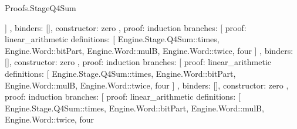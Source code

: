 \begin{lexlean}{Proofs.StageQ4Sum}
\begin{semanticmodule}
{{{{{{{{{{{{                                  ]
                                },
                                binders: [],
                                constructor: zero
                              },
                              {
                                proof: induction{
                                  branches: [
                                    {
                                      proof: linear_arithmetic{
                                        definitions: [
                                          Engine.Stage.Q4Sum::times,
                                          Engine.Word::bitPart,
                                          Engine.Word::mulB,
                                          Engine.Word::twice,
                                          four
                                        ]
                                      },
                                      binders: [],
                                      constructor: zero
                                    },
                                    {
                                      proof: induction{
                                        branches: [
                                          {
                                            proof: linear_arithmetic{
                                              definitions: [
                                                Engine.Stage.Q4Sum::times,
                                                Engine.Word::bitPart,
                                                Engine.Word::mulB,
                                                Engine.Word::twice,
                                                four
                                              ]
                                            },
                                            binders: [],
                                            constructor: zero
                                          },
                                          {
                                            proof: induction{
                                              branches: [
                                                {
                                                  proof: linear_arithmetic{
                                                    definitions: [
                                                      Engine.Stage.Q4Sum::times,
                                                      Engine.Word::bitPart,
                                                      Engine.Word::mulB,
                                                      Engine.Word::twice,
                                                      four
}}}}}}}}}}}}}}}}}}
\end{semanticmodule}
\end{lexlean}
